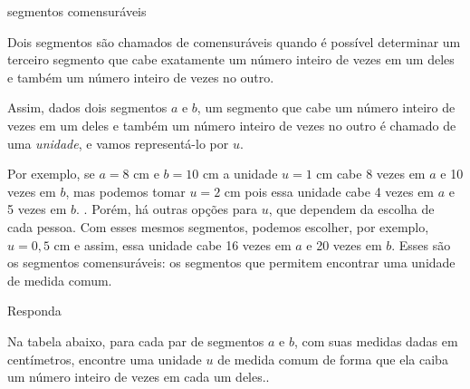 \begin{task}{segmentos comensuráveis}



Dois segmentos são chamados de comensuráveis quando é possível determinar um terceiro segmento que cabe exatamente um número inteiro de vezes em um deles e também um número inteiro de vezes no outro.

Assim, dados dois segmentos \(a\) e \(b\), um segmento que cabe um número inteiro de vezes em um deles e também um número inteiro de vezes no outro é chamado de uma \textit{unidade}, e vamos representá-lo por \(u\).

Por exemplo, se \(a = 8\) cm e \(b = 10\) cm a unidade \(u = 1\) cm cabe 8 vezes em \(a\) e 10 vezes em \(b\), mas podemos tomar \(u = 2\) cm pois essa unidade cabe 4 vezes em \(a\) e 5 vezes em \(b\). . Porém, há outras opções para \(u\), que dependem da escolha de cada pessoa. Com esses mesmos segmentos, podemos escolher, por exemplo,  \(u = 0{,}5\) cm e assim, essa unidade cabe 16 vezes em \(a\) e 20 vezes em \(b\).
Esses são os segmentos comensuráveis: os segmentos que permitem encontrar uma unidade de medida comum.

Responda

Na tabela abaixo, para cada par de segmentos \(a\) e \(b\), com suas medidas dadas em centímetros,  encontre uma unidade \(u\) de medida comum de forma que ela caiba um número inteiro de vezes em cada um deles..
\end{task}




